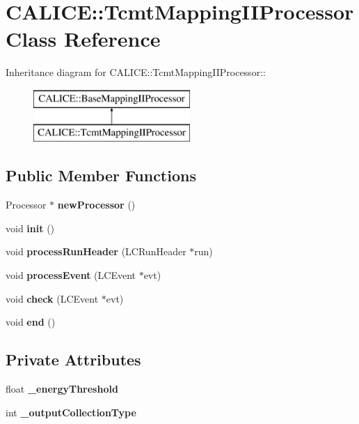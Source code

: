 \section{CALICE::TcmtMappingIIProcessor Class Reference}
\label{classCALICE_1_1TcmtMappingIIProcessor}
Inheritance diagram for CALICE::TcmtMappingIIProcessor::\begin{figure}[H]
\begin{center}
\leavevmode
\includegraphics[height=2cm]{classCALICE_1_1TcmtMappingIIProcessor}
\end{center}
\end{figure}
\subsection*{Public Member Functions}
\begin{DoxyCompactItemize}
\item 
Processor $\ast$ {\bfseries newProcessor} ()\label{classCALICE_1_1TcmtMappingIIProcessor_ac417015d21a1632426336568a495a2fa}

\item 
void {\bfseries init} ()\label{classCALICE_1_1TcmtMappingIIProcessor_ace486ac86291c644b789d0aa08594c5c}

\item 
void {\bfseries processRunHeader} (LCRunHeader $\ast$run)\label{classCALICE_1_1TcmtMappingIIProcessor_a1a174e14b6a40294339c428a7a03b58a}

\item 
void {\bfseries processEvent} (LCEvent $\ast$evt)\label{classCALICE_1_1TcmtMappingIIProcessor_ad6fb82cdf2edfcf25c94b1ffcc6a2fc6}

\item 
void {\bfseries check} (LCEvent $\ast$evt)\label{classCALICE_1_1TcmtMappingIIProcessor_abc7540afa5e54c3f3908dfb9ef6691d7}

\item 
void {\bfseries end} ()\label{classCALICE_1_1TcmtMappingIIProcessor_aad749b67ac8b671bbb16bb52b49dd714}

\end{DoxyCompactItemize}
\subsection*{Private Attributes}
\begin{DoxyCompactItemize}
\item 
float {\bfseries \_\-energyThreshold}\label{classCALICE_1_1TcmtMappingIIProcessor_acf3598b6f599e7ec7c691b0995c86ca0}

\item 
int {\bfseries \_\-outputCollectionType}\label{classCALICE_1_1TcmtMappingIIProcessor_ad941439d1f231ec3ea9ca0cfdd25c142}

\end{DoxyCompactItemize}


